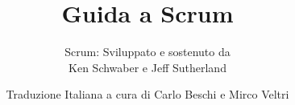 \documentclass[a4paper,12pt,oneside]{article}
\begin{document}
\title{Guida a Scrum}
\subtitle{Scrum: Sviluppato e sostenuto da \\ Ken Schwaber e Jeff Sutherland}
\author{Traduzione Italiana a cura di Carlo Beschi e Mirco Veltri}
\date{}

\maketitle

	
\end{document}
